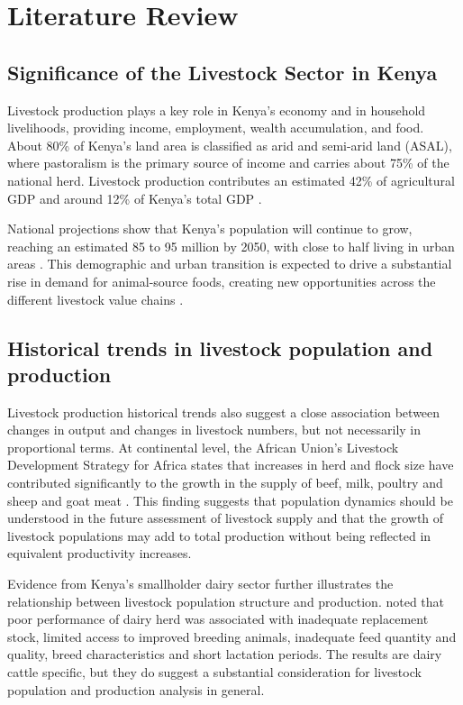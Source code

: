 \section{Literature Review}

\subsection{Significance of the Livestock Sector in Kenya}

Livestock production plays a key role in Kenya's economy and in household livelihoods, providing income, employment, wealth accumulation, and food. About 80\% of Kenya's land area is classified as arid and semi-arid land (ASAL), where pastoralism is the primary source of income and carries about 75\% of the national herd. Livestock production contributes an estimated 42\% of agricultural GDP and around 12\% of Kenya's total GDP \cite{nyariki2019}.

National projections show that Kenya's population will continue to grow, reaching an estimated 85 to 95 million by 2050, with close to half living in urban areas \cite{knbs2019}. This demographic and urban transition is expected to drive a substantial rise in demand for animal-source foods, creating new opportunities across the different livestock value chains \cite{fao2019}.

\subsection{Historical trends in livestock population and production }

Livestock production historical trends also suggest a close association between changes in output and changes in livestock numbers, but not necessarily in proportional terms. At continental level, the African Union's Livestock Development Strategy for Africa states that increases in herd and flock size have contributed significantly to the growth in the supply of beef, milk, poultry and sheep and goat meat \cite{africanunion2015}. This finding suggests that population dynamics should be understood in the future assessment of livestock supply and that the growth of livestock populations may add to total production without being reflected in equivalent productivity increases. 

Evidence from Kenya's smallholder dairy sector further illustrates the relationship between livestock population structure and production. \citet{wanjala2014} noted that poor performance of dairy herd was associated with inadequate replacement stock, limited access to improved breeding animals, inadequate feed quantity and quality, breed characteristics and short lactation periods. The results are dairy cattle specific, but they do suggest a substantial consideration for livestock population and production analysis in general. 

